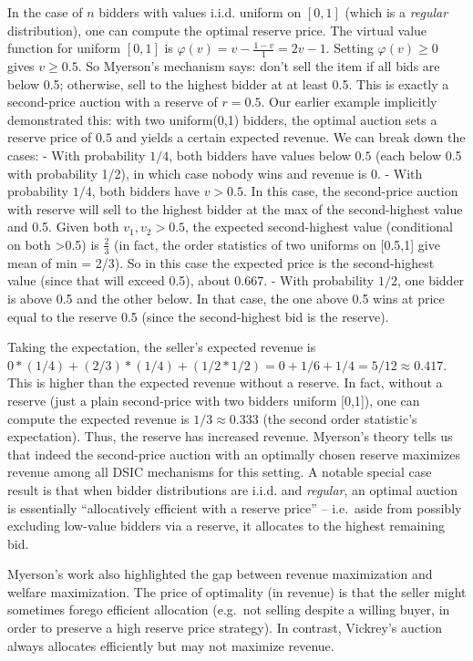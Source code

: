 \documentclass[
  letterpaper,
  numbers=noenddot,
  DIV=11]{scrreprt}
\theoremstyle{definition}
\theoremstyle{plain}
\theoremstyle{plain}
\theoremstyle{remark}
\begin{document}
In the case of \(n\) bidders with values i.i.d. uniform on \([0,1]\)
(which is a \emph{regular} distribution), one can compute the optimal
reserve price. The virtual value function for uniform \([0,1]\) is
\(\varphi(v) = v - \frac{1-v}{1} = 2v - 1\). Setting \(\varphi(v)\ge 0\)
gives \(v \ge 0.5\). So Myerson's mechanism says: don't sell the item if
all bids are below 0.5; otherwise, sell to the highest bidder at at
least 0.5. This is exactly a second-price auction with a reserve of
\(r=0.5\). Our earlier example implicitly demonstrated this: with two
uniform(0,1) bidders, the optimal auction sets a reserve price of
\(0.5\) and yields a certain expected revenue. We can break down the
cases: - With probability \(1/4\), both bidders have values below
\(0.5\) (each below 0.5 with probability 1/2), in which case nobody wins
and revenue is 0. - With probability \(1/4\), both bidders have
\(v > 0.5\). In this case, the second-price auction with reserve will
sell to the highest bidder at the max of the second-highest value and
0.5. Given both \(v_1, v_2 > 0.5\), the expected second-highest value
(conditional on both \textgreater0.5) is \(\frac{2}{3}\) (in fact, the
order statistics of two uniforms on {[}0.5,1{]} give mean of min = 2/3).
So in this case the expected price is the second-highest value (since
that will exceed 0.5), about 0.667. - With probability \(1/2\), one
bidder is above 0.5 and the other below. In that case, the one above 0.5
wins at price equal to the reserve 0.5 (since the second-highest bid is
the reserve).

Taking the expectation, the seller's expected revenue is
\(0*(1/4) + (2/3)*(1/4) + (1/2*1/2) = 0 + 1/6 + 1/4 = 5/12 \approx 0.417\).
This is higher than the expected revenue without a reserve. In fact,
without a reserve (just a plain second-price with two bidders uniform
{[}0,1{]}), one can compute the expected revenue is
\(1/3 \approx 0.333\) (the second order statistic's expectation). Thus,
the reserve has increased revenue. Myerson's theory tells us that indeed
the second-price auction with an optimally chosen reserve maximizes
revenue among all DSIC mechanisms for this setting. A notable special
case result is that when bidder distributions are i.i.d. and
\emph{regular}, an optimal auction is essentially ``allocatively
efficient with a reserve price'' -- i.e.~aside from possibly excluding
low-value bidders via a reserve, it allocates to the highest remaining
bid.

Myerson's work also highlighted the gap between revenue maximization and
welfare maximization. The price of optimality (in revenue) is that the
seller might sometimes forego efficient allocation (e.g.~not selling
despite a willing buyer, in order to preserve a high reserve price
strategy). In contrast, Vickrey's auction always allocates efficiently
but may not maximize revenue.
\end{document}
